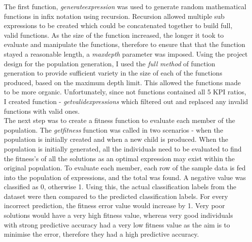 \documentclass[11pt]{article}
\begin{document}
The first function, \textit{generate\textunderscore expression} was used to generate random mathematical functions in infix notation using recursion. Recursion allowed multiple sub expressions to be created which could be concatenated together to build full, valid functions. 
As the size of the function increased, the longer it took to evaluate and manipulate the functions, therefore to ensure that that the function stayed a reasonable length, a \textit{max\textunderscore depth} parameter was imposed.
Using the project design for the population generation, I used the \textit{full method}\cite{?} of function generation to provide sufficient variety in the size of each of the functions produced, based on the maximum depth limit. This allowed the functions made to be more organic. 
Unfortunately, since not functions contained all 5 KPI ratios, I created function - \textit{get\textunderscore valid\textunderscore expressions} which filtered out and replaced any invalid functions with valid ones. 
 \\ %
The next step was to create a fitness function to evaluate each member of the population.
The \textit{get\textunderscore fitness} function was called in two scenarios - when the population is initially created and when a new child is produced. When the population is initially generated, all the individuals need to be evaluated to find the fitness's of all the solutions as an optimal expression may exist within the original population. To evaluate each member, each row of the sample data is fed into the population of expressions, and the total was found. A negative value was classified as 0, otherwise 1. Using this, the actual classification labels from the dataset were then compared to the predicted classification labels. For every incorrect prediction, the fitness error value would increase by 1. Very poor solutions would have a very high fitness value, whereas very good individuals with strong predictive accuracy had a very low fitness value as the aim is to minimise the error, therefore they had a high predictive accuracy.\\
\end{document}
